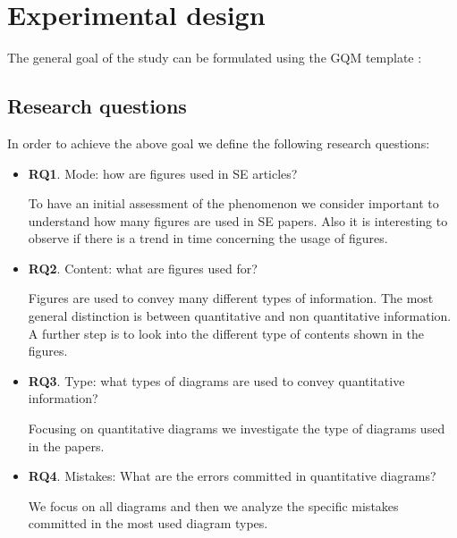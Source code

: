 \documentclass[
  10pt,
  conference,
]{IEEEtran}%
\begin{document}
\section{Experimental design}\label{experimental-design}

The general goal of the study can be formulated using the GQM template
:

\begin{table}

\caption{\label{tbl-GQM}GQM definition}


\end{table}%

\subsection{Research questions}\label{research-questions}

In order to achieve the above goal we define the following research
questions:

\begin{itemize}
\item
  \textbf{RQ1}. Mode: how are figures used in SE articles?

  To have an initial assessment of the phenomenon we consider important
  to understand how many figures are used in SE papers. Also it is
  interesting to observe if there is a trend in time concerning the
  usage of figures.
\item
  \textbf{RQ2}. Content: what are figures used for?

  Figures are used to convey many different types of information. The
  most general distinction is between quantitative and non quantitative
  information. A further step is to look into the different type of
  contents shown in the figures.
\item
  \textbf{RQ3}. Type: what types of diagrams are used to convey
  quantitative information?

  Focusing on quantitative diagrams we investigate the type of diagrams
  used in the papers.
\item
  \textbf{RQ4}. Mistakes: What are the errors committed in quantitative
  diagrams?

  We focus on all diagrams and then we analyze the specific mistakes
  committed in the most used diagram types.
\end{itemize}
\end{document}
